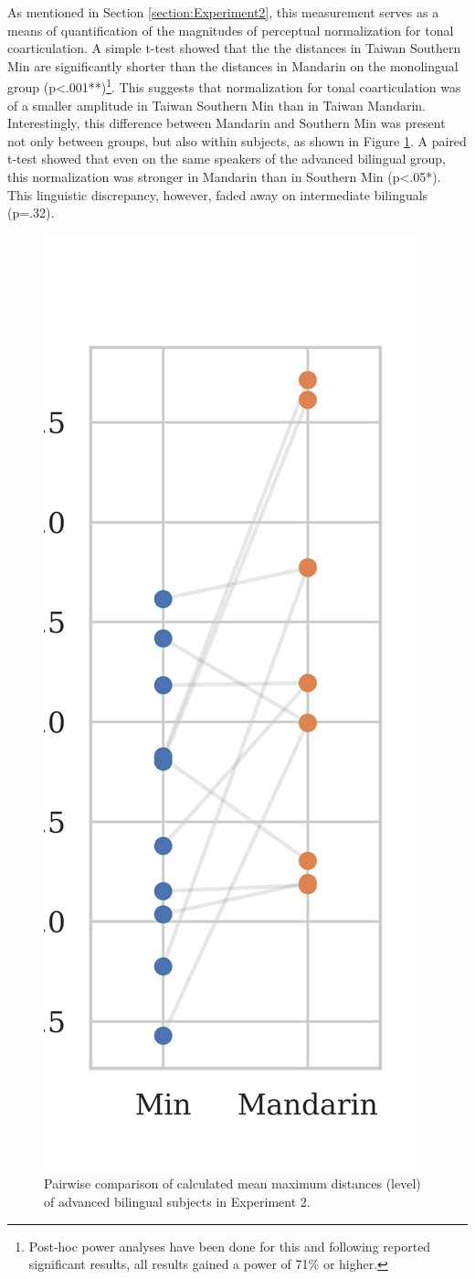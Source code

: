 
As mentioned in Section \ref{section:Experiment2}, this measurement serves as a means of quantification of the magnitudes of perceptual normalization for tonal coarticulation. A simple t-test showed that the the distances in Taiwan Southern Min are significantly shorter than the distances in Mandarin on the monolingual group (p<.001**)\footnote{Post-hoc power analyses have been done for this and following reported significant results, all results gained a power of 71\% or higher.}. This suggests that normalization for tonal coarticulation was of a smaller amplitude in Taiwan Southern Min than in Taiwan Mandarin. Interestingly, this difference between Mandarin and Southern Min was present not only between groups, but also within subjects, as shown in Figure \ref{Figure:DistBilingualBoxPlot}. A paired t-test showed that even on the same speakers of the advanced bilingual group, this normalization was stronger in Mandarin than in Southern Min (p<.05*). This linguistic discrepancy, however, faded away on intermediate bilinguals (p=.32).

\begin{figure}[hbt!]
\centering
\includegraphics[width=.3\textwidth, trim={0 .5cm 0 0}]{figures/E2/Result_bilingual.png}
\caption{Pairwise comparison of calculated mean maximum distances (level) of advanced bilingual subjects in Experiment 2.}
\label{Figure:DistBilingualBoxPlot}
\end{figure}

